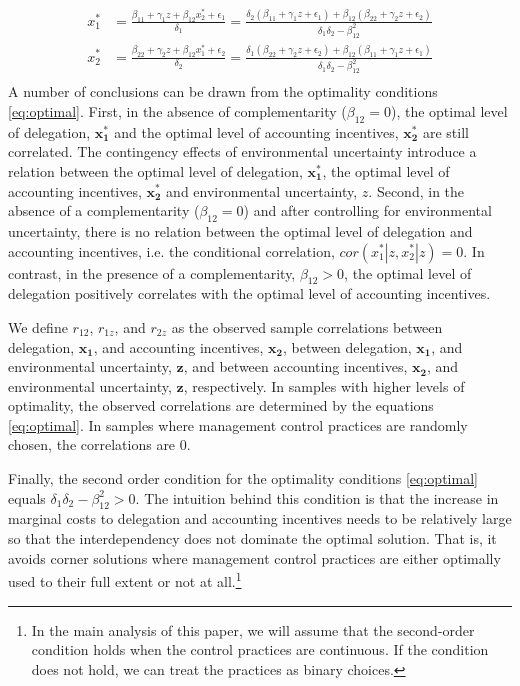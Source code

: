 \documentclass[12pt]{article}
\begin{document}
\begin{equation}\label{eq:optimal}
\begin{aligned}
x_1^* &= \frac{\beta_{11} + \gamma_1 z + \beta_{12} x_2^*  + \epsilon_{1}}{\delta_1 }
		      = \frac{\delta_2 (\beta_{11} + \gamma_1 z + \epsilon_1) 
           					+ \beta_{12} (\beta_{22} + \gamma_2 z + \epsilon_2) }
                            {\delta_1 \delta_2 - \beta_{12}^2} \\
 x_2^* &= \frac{\beta_{22} + \gamma_2 z + \beta_{12} x_1^* + \epsilon_{2}}{\delta_2  }
		      =  \frac{\delta_1 (\beta_{22} + \gamma_2 z + \epsilon_2) 
           					+ \beta_{12} (\beta_{11} + \gamma_1 z + \epsilon_1) }
                            {\delta_1 \delta_2 - \beta_{12}^2} \\
\end{aligned}
\end{equation}
A number of conclusions can be drawn from the optimality conditions \eqref{eq:optimal}. First, in the absence of complementarity ($\beta_{12}=0$), the optimal level of delegation, $\mathbf{x^*_1}$ and the optimal level of accounting incentives, $\mathbf{x^*_2}$ are still correlated. The contingency effects of environmental uncertainty introduce a relation between the optimal level of delegation, $\mathbf{x^*_1}$, the optimal level of accounting incentives, $\mathbf{x^*_2}$ and environmental uncertainty, $z$. Second, in the absence of a complementarity ($\beta_{12} = 0$) and after controlling for environmental uncertainty, there is no relation between the optimal level of delegation and accounting incentives, i.e. the conditional correlation, $cor(x^*_1 | z, x^*_2 |z) = 0$.  In contrast, in the presence of a complementarity, $\beta_{12} > 0$, the optimal level of delegation positively correlates with the optimal level of accounting incentives. 

We define $r_{12}$, $r_{1z}$, and $r_{2z}$ as the observed sample correlations between delegation, $\mathbf{x_1}$, and accounting incentives, $\mathbf{x_2}$,  between delegation, $\mathbf{x_1}$, and environmental uncertainty, $\mathbf{z}$, and between accounting incentives, $\mathbf{x_2}$, and environmental uncertainty, $\mathbf{z}$, respectively. In samples with higher levels of optimality, the observed correlations are determined by the equations \eqref{eq:optimal}.  In samples where management control practices are randomly chosen, the correlations are $0$. 

Finally, the second order condition for the optimality conditions \eqref{eq:optimal} equals $\delta_1 \delta_2 - \beta_{12}^2 > 0$. The intuition behind this condition is that the increase in marginal costs to delegation and accounting incentives needs to be relatively large so that the interdependency does not dominate the optimal solution. That is, it avoids corner solutions where management control practices are either optimally used to their full extent or not at all.\footnote{In the main analysis of this paper, we will assume that the second-order condition holds when the control practices are continuous. If the condition does not hold, we can treat the practices as binary choices.}
\end{document}
